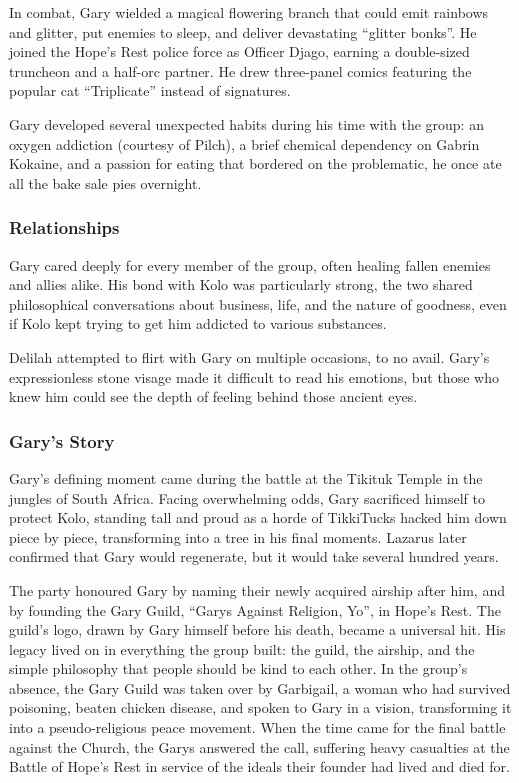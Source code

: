 In combat, Gary wielded a magical flowering branch that could emit rainbows and glitter, put enemies to sleep, and deliver devastating ``glitter bonks''.  He joined the Hope's Rest police force as Officer Djago, earning a double-sized truncheon and a half-orc partner.  He drew three-panel comics featuring the popular cat ``Triplicate'' instead of signatures.

Gary developed several unexpected habits during his time with the group: an oxygen addiction (courtesy of Pilch), a brief chemical dependency on Gabrin Kokaine, and a passion for eating that bordered on the problematic, he once ate all the bake sale pies overnight.

\subsubsection{Relationships}

Gary cared deeply for every member of the group, often healing fallen enemies and allies alike.  His bond with Kolo was particularly strong, the two shared philosophical conversations about business, life, and the nature of goodness, even if Kolo kept trying to get him addicted to various substances.

Delilah attempted to flirt with Gary on multiple occasions, to no avail.  Gary's expressionless stone visage made it difficult to read his emotions, but those who knew him could see the depth of feeling behind those ancient eyes.

\subsubsection{Gary's Story}

Gary's defining moment came during the battle at the Tikituk Temple in the jungles of South Africa.  Facing overwhelming odds, Gary sacrificed himself to protect Kolo, standing tall and proud as a horde of TikkiTucks hacked him down piece by piece, transforming into a tree in his final moments.  Lazarus later confirmed that Gary would regenerate, but it would take several hundred years.

The party honoured Gary by naming their newly acquired airship after him, and by founding the Gary Guild, ``Garys Against Religion, Yo'', in Hope's Rest.  The guild's logo, drawn by Gary himself before his death, became a universal hit.  His legacy lived on in everything the group built: the guild, the airship, and the simple philosophy that people should be kind to each other.  In the group's absence, the Gary Guild was taken over by Garbigail, a woman who had survived poisoning, beaten chicken disease, and spoken to Gary in a vision, transforming it into a pseudo-religious peace movement.  When the time came for the final battle against the Church, the Garys answered the call, suffering heavy casualties at the Battle of Hope's Rest in service of the ideals their founder had lived and died for.

